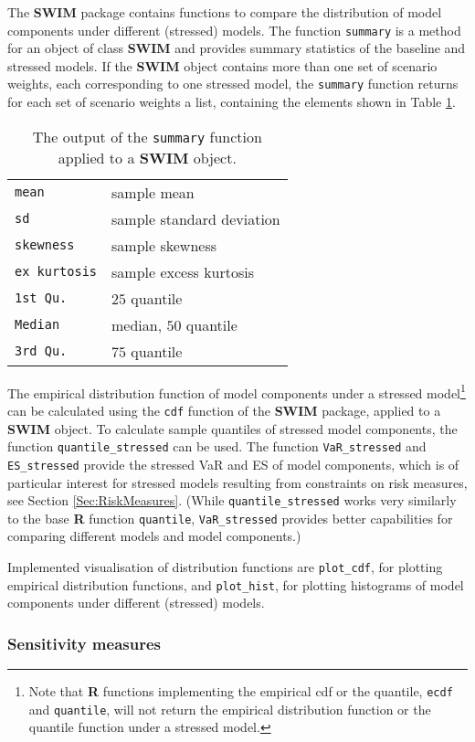 \documentclass[
]{article}
\begin{document}
The \textbf{SWIM} package contains functions to compare the distribution of model components under different (stressed) models. The function \texttt{summary} is a method for an object of class \textbf{SWIM} and provides summary statistics of the baseline and stressed models. If the \textbf{SWIM} object contains more than one set of scenario weights, each corresponding to one stressed model, the \texttt{summary} function returns for each set of scenario weights a list, containing the elements shown in Table \ref{tab:summary}.

\begin{longtable}[]{@{}ll@{}}
\caption{\label{tab:summary} The output of the \texttt{summary} function applied to a \textbf{SWIM} object.}\tabularnewline
\toprule
\endhead
\texttt{mean} & sample mean\tabularnewline
\texttt{sd} & sample standard deviation\tabularnewline
\texttt{skewness} & sample skewness\tabularnewline
\texttt{ex\ kurtosis} & sample excess kurtosis\tabularnewline
\texttt{1st\ Qu.} & \(25%
\) quantile\tabularnewline
\texttt{Median} & median, \(50%
\) quantile\tabularnewline
\texttt{3rd\ Qu.} & \(75%
\) quantile\tabularnewline
\bottomrule
\end{longtable}

The empirical distribution function of model components under a stressed model\footnote{Note that \textbf{R} functions implementing the empirical cdf or the quantile, \texttt{ecdf} and \texttt{quantile}, will not return the empirical distribution function or the quantile function under a stressed model.} can be calculated using the \texttt{cdf} function of the \textbf{SWIM} package, applied to a \textbf{SWIM} object. To calculate sample quantiles of stressed model components, the function \texttt{quantile\_stressed} can be used. The function \texttt{VaR\_stressed} and \texttt{ES\_stressed} provide the stressed VaR and ES of model components, which is of particular interest for stressed models resulting from constraints on risk measures, see Section \ref{Sec:RiskMeasures}. (While \texttt{quantile\_stressed} works very similarly to the base \textbf{R} function \texttt{quantile}, \texttt{VaR\_stressed} provides better capabilities for comparing different models and model components.)

Implemented visualisation of distribution functions are \texttt{plot\_cdf}, for plotting empirical distribution functions, and \texttt{plot\_hist}, for plotting histograms of model components under different (stressed) models.

\hypertarget{sensitivity-measures}{%
\subsubsection{Sensitivity measures}\label{sensitivity-measures}}
\end{document}
